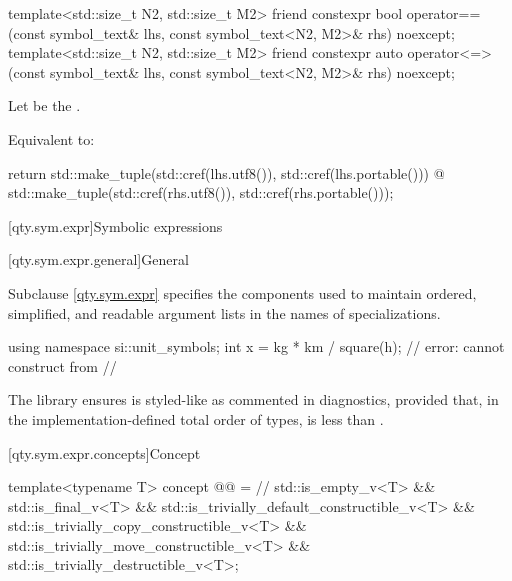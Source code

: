\begin{itemdecl}
template<std::size_t N2, std::size_t M2>
friend constexpr bool operator==(const symbol_text& lhs,
                                 const symbol_text<N2, M2>& rhs) noexcept;
template<std::size_t N2, std::size_t M2>
friend constexpr auto operator<=>(const symbol_text& lhs,
                                  const symbol_text<N2, M2>& rhs) noexcept;
\end{itemdecl}

\begin{itemdescr}
\pnum
Let  be the .

\pnum
\effects
Equivalent to:
\begin{codeblock}
return std::make_tuple(std::cref(lhs.utf8()), std::cref(lhs.portable())) @\atsign@
       std::make_tuple(std::cref(rhs.utf8()), std::cref(rhs.portable()));
\end{codeblock}
\end{itemdescr}

[qty.sym.expr]{Symbolic expressions}

[qty.sym.expr.general]{General}

\pnum
Subclause \ref{qty.sym.expr} specifies the components
used to maintain ordered, simplified, and readable
argument lists in the names of specializations.
\begin{example}
\begin{codeblock}
using namespace si::unit_symbols;
int x = kg * km / square(h);  // error: cannot construct from
  // 
\end{codeblock}
The library ensures  is styled-like as commented in diagnostics,
provided that, in the implementation-defined total order of types,
 is less than .
\end{example}

[qty.sym.expr.concepts]{Concept }

\begin{itemdecl}
template<typename T>
concept @@ =  // \expos
  std::is_empty_v<T> && std::is_final_v<T> && std::is_trivially_default_constructible_v<T> &&
  std::is_trivially_copy_constructible_v<T> && std::is_trivially_move_constructible_v<T> &&
  std::is_trivially_destructible_v<T>;
\end{itemdecl}

